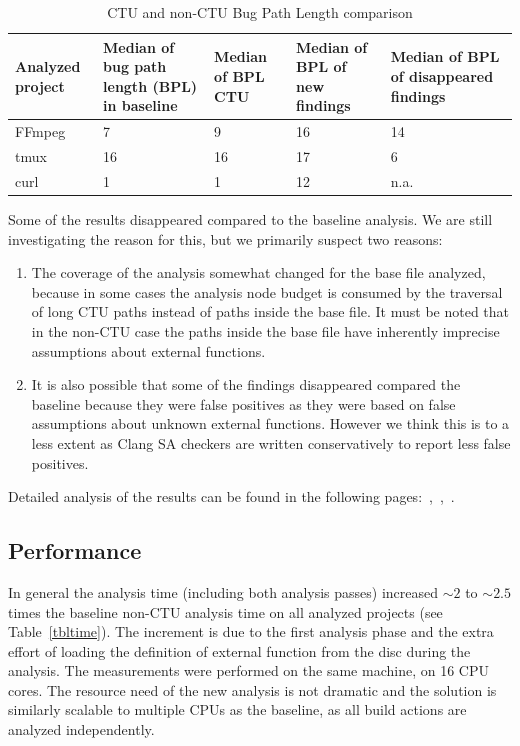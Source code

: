 \documentclass{article}
\begin{document}
\begin {table}[h!]
\centering
\begin{tabular}{| C{2cm}|| C{2cm} | C{2cm} |C{2cm} |C{2cm} |}
  \hline
  Analyzed project & Median of bug path length (BPL) in baseline&Median of BPL CTU&Median of BPL of new findings&Median of BPL of disappeared findings\\
  \hline
  \hline
  FFmpeg&7&9&16&14\\
  \hline
  tmux&16&16&17&6\\
  \hline
  curl& 1&1&12&n.a.\\
  \hline  
\end{tabular}
\caption{CTU and non-CTU Bug Path Length comparison}
\label{tblbpl}
\end{table}

Some of the results disappeared compared to the baseline analysis. 
We are still investigating the reason for this, but we primarily 
suspect two reasons:

\begin{enumerate}
  \item The coverage of the analysis somewhat changed for the base file
        analyzed, because in some cases the analysis node budget is consumed
        by the traversal of long CTU paths instead of paths inside the base
        file. It must be noted that in the non-CTU case the paths inside the
        base file have inherently imprecise assumptions about external
        functions.

  \item It is also possible that some of the findings disappeared
        compared the baseline because they were false positives as they were
        based on false assumptions about unknown external functions. However
        we think this is to a less extent as Clang SA checkers are written
        conservatively to report less false positives.
\end{enumerate}

Detailed analysis of the results can be found in the following
pages:~\cite{ffmpegres},~\cite{tmuxres},~\cite{curlres}.

\subsection{Performance}
In general the analysis time (including both analysis passes) 
increased $\sim 2$ to $\sim 2.5$ times the baseline non-CTU analysis time on all analyzed
projects (see Table~\ref{tbltime}). The increment is due to the first analysis phase and the extra effort
of loading the definition of external function from the disc during the
analysis. The measurements were performed on the same machine, on 16 CPU cores.
The resource need of the new analysis is not dramatic and the solution is
similarly scalable to multiple CPUs as the baseline, as all build actions
are analyzed independently.
\end{document}
